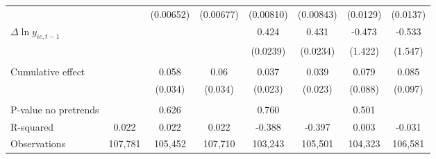 {\begin{tabular}{l*{7}{c}}
          &                  &(0.00652)         &(0.00677)         &(0.00810)         &(0.00843)         & (0.0129)         & (0.0137)         \\
[1em]
$\Delta \ln y_{ic,t-1}$&                  &                  &                  &    0.424\sym{***}&    0.431\sym{***}&   -0.473         &   -0.533         \\
          &                  &                  &                  & (0.0239)         & (0.0234)         &  (1.422)         &  (1.547)         \\
\hline
\vspace{-2mm}&                  &                  &                  &                  &                  &                  &                  \\
Cumulative effect&                  &0.058\sym{*}         &0.06\sym{*}         &    0.037         &0.039\sym{*}         &    0.079         &    0.085         \\
          &                  &  (0.034)         &  (0.034)         &  (0.023)         &  (0.023)         &  (0.088)         &  (0.097)         \\
\hline    &                  &                  &                  &                  &                  &                  &                  \\
P-value no pretrends&                  &    0.626         &                  &    0.760         &                  &    0.501         &                  \\
R-squared &    0.022         &    0.022         &    0.022         &   -0.388         &   -0.397         &    0.003         &   -0.031         \\
Observations&  107,781         &  105,452         &  107,710         &  103,243         &  105,501         &  104,323         &  106,581         \\
\hline\hline
\end{tabular}
}
